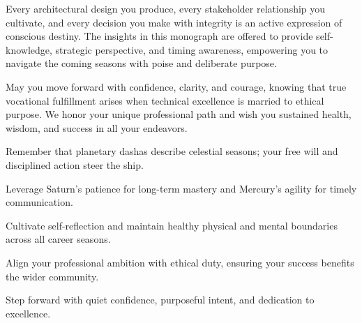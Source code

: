 {\fontsize{9}{13}\selectfont Every architectural design you produce, every stakeholder relationship you cultivate, and every decision you make with integrity is an active expression of conscious destiny. The insights in this monograph are offered to provide self-knowledge, strategic perspective, and timing awareness, empowering you to navigate the coming seasons with poise and deliberate purpose.}\par\vspace{1.8mm}

{\fontsize{9}{13}\selectfont May you move forward with confidence, clarity, and courage, knowing that true vocational fulfillment arises when technical excellence is married to ethical purpose. We honor your unique professional path and wish you sustained health, wisdom, and success in all your endeavors.}\par\vspace{1.8mm}

\begin{diamondlist}
  \item {\fontsize{8.5}{12}\selectfont Remember that planetary dashas describe celestial seasons; your free will and disciplined action steer the ship.}
  \item {\fontsize{8.5}{12}\selectfont Leverage Saturn's patience for long-term mastery and Mercury's agility for timely communication.}
  \item {\fontsize{8.5}{12}\selectfont Cultivate self-reflection and maintain healthy physical and mental boundaries across all career seasons.}
  \item {\fontsize{8.5}{12}\selectfont Align your professional ambition with ethical duty, ensuring your success benefits the wider community.}
  \item {\fontsize{8.5}{12}\selectfont Step forward with quiet confidence, purposeful intent, and dedication to excellence.}
\end{diamondlist}

